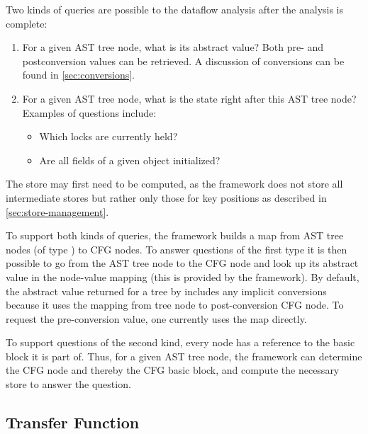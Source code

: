 Two kinds of queries are possible to the dataflow analysis after the
analysis is complete:
\begin{enumerate}
    \item For a given AST tree node, what is its abstract value?  Both
      pre- and postconversion values can be retrieved.
      A discussion of conversions can be found in \autoref{sec:conversions}.
    \item For a given AST tree node, what is the state right after
      this AST tree node?  Examples of questions include:
    \begin{itemize}
        \item Which locks are currently held?
        \item Are all fields of a given object initialized?
    \end{itemize}
\end{enumerate}

The store may first need to be computed, as the framework does not
store all intermediate stores but rather only those for key positions
as described in \autoref{sec:store-management}.

To support both kinds of queries, the framework builds a map from AST
tree nodes (of type ) to CFG nodes.  To
answer questions of the first type it is then possible to go from the
AST tree node to the CFG node and look up its abstract value in the
node-value mapping (this is provided by the framework).  By default,
the abstract value returned for a tree by
 includes any implicit conversions
because it uses the mapping from tree node to post-conversion CFG
node.  To request the pre-conversion value, one currently uses the
 map directly.

To support questions of the second kind, every node has a reference to
the basic block it is part of. Thus, for a given AST tree node, the
framework can determine the CFG node and thereby the CFG basic block,
and compute the necessary store to answer the question.


\subsection{Transfer Function}
\label{sec:transfer-fnc}

